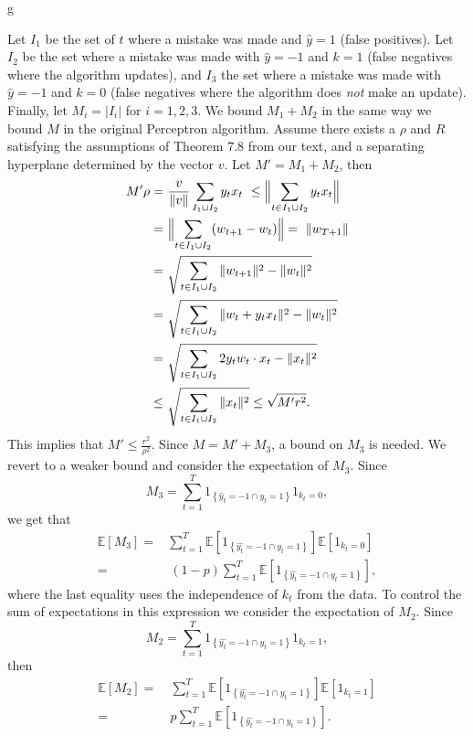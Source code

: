 g\documentclass[12pt]{article}
\newcommand{\E}[0]{\mathbb{E}}
\begin{document}
Let $I_1$ be the set of $t$ where a mistake was made and
$\widehat{y}=1$ (false positives).  Let $I_2$ be the set where a mistake was made with
$\widehat{y} = -1$ and $k = 1$ (false negatives where the algorithm updates), and $I_3$ the set where a mistake was
made with $\widehat{y} = -1$ and $k = 0$ (false negatives where the algorithm does {\it not} make an update). Finally, let $M_i = |I_i|$ for $i =
1,2,3$. We bound $M_1 + M_2$ in the same way we bound $M$ in the original Perceptron algorithm. Assume there exists a $\rho$ and $R$ satisfying the assumptions of Theorem 7.8 from our text, and a separating hyperplane determined by the vector $v$. Let $M' = M_1 + M_2$, then
\begin{align*}
M' \rho =&\ \frac{v}{\|v\|}\sum_{I_1 \cup I_2} y_tx_t \
 \leq   \Bigl\|\sum_{t \in I_1 \cup I_2} y_t x_t\Bigr\| \\
=& \ \Bigl\|\sum_{t \in I_1 \cup I_2} (w_{t+1} - w_t) \Bigr\| 
= \ \|w_{T+1} \| \\
=&\ \sqrt{\sum_{t \in I_1 \cup I_2} \|  w_{t+1}\|^2 - \|w_t\|^2 }\\
= &\ \sqrt{\sum_{t \in I_1 \cup I_2} \|  w_{t} + y_t x_t\|^2 - \|w_t\|^2 }\\
= &\ \sqrt{\sum_{t \in I_1 \cup I_2} 2y_t w_t\cdot x_t - \|x_t\|^2} \\
\leq &\ \sqrt{\sum_{t \in I_1 \cup I_2} \|x_t\|^2}
\leq \sqrt{M'r^2}.
\end{align*}
This implies that $M' \leq \frac{r^2}{\rho^2}$. Since $M = M' + M_3$, a bound on $M_3$ is needed. We revert to a weaker bound and consider the expectation of
$M_3$. Since 
\[M_3 = \sum_{t=1}^T 1_{\left\{\widehat{y}_t = -1 \cap y_t = 1\right\}}1_{k_t = 0}, \]
we get that
\begin{align*}
\E[M_3] = & \sum_{t=1}^T \E[1_{\left\{\widehat{y_t} = -1 \cap y_t = 1\right\}}]\E[1_{k_t = 0}] \\
 = &\ (1 - p)\sum_{t=1}^T \E[1_{\left\{\widehat{y_t} = -1 \cap y_t = 1\right\}}],
\end{align*}
where the last equality uses the independence of $k_t$ from the data. To control the sum of expectations in this expression we consider the expectation of $M_2$. Since
\[
M_2 =  \sum_{t=1}^T 1_{\left\{\hat{y_t} = -1 \cap y_t = 1\right\}}1_{k_t = 1},
\]
then
\begin{align*}
\E[M_2] =&\ \sum_{t=1}^T \E[1_{\left\{\hat{y_t} = -1 \cap y_t = 1\right\}}]\E[1_{k_t = 1}] \\
=&\ p\sum_{t=1}^T \E[1_{\left\{\hat{y_t} = -1 \cap y_t = 1\right\}}].
\end{align*}
\end{document}
